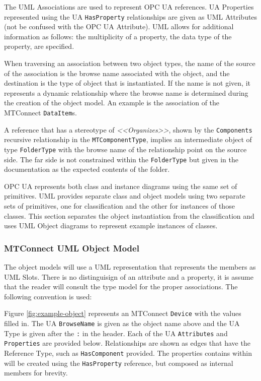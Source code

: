 The UML Associations are used to represent OPC UA references. UA Properties represented using the UA \texttt{Has\-Property} relationships are given as UML Attributes (not be confused with the OPC UA Attribute). UML allows for additional information as follows:  the multiplicity of a property, the data type of the property, are specified.



When traversing an association between two object types, the name of the source of the association is the browse name associated with the object, and the destination is the type of object that is instantiated. If the name is not given, it represents a dynamic relationship where the browse name is determined during the creation of the object model. An example is the association of the MTConnect \texttt{DataItem}s.

A reference that has a stereotype of \textit{<<Organizes>>}, shown by the \texttt{Components} recursive relationship in the \texttt{MTComponentType}, implies an intermediate object of type \texttt{FolderType} with the browse name of the relationship point on the source side. The far side is not constrained within the \texttt{FolderType} but given in the documentation as the expected contents of the folder.

OPC UA represents both class and instance diagrams using the same set of primitives. UML provides separate class and object models using two separate sets of primitives, one for classification and the other for instances of those classes. This section separates the object instantiation from the classification and uses UML Object diagrams to represent example instances of classes.

\FloatBarrier

\subsubsection{MTConnect UML Object Model}

The object models will use a UML representation that represents the members as UML Slots. There is no distinguisign of an attribute and a property, it is assume that the reader will consult the type model for the proper associations. The following convention is used:



Figure \ref{fig:example-object} represents an MTConnect \texttt{Device} with the values filled in. The UA \texttt{Browse\-Name} is given as the object name above and the UA Type is given after the \texttt{:} in the header. Each of the UA \texttt{Attributes} and \texttt{Properties} are provided below. Relationships are shown as edges that have the Reference Type, such as \texttt{Has\-Component} provided. The properties contains within will be created using the \texttt{Has\-Property} reference, but composed as internal members for brevity.

